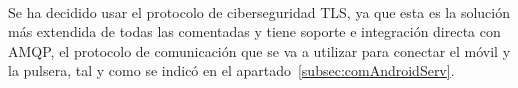 \paragraph{}
Se ha decidido usar el protocolo de ciberseguridad TLS, ya que esta es la solución más extendida de todas las comentadas y tiene soporte e integración directa con AMQP, el protocolo de comunicación que se va a utilizar para conectar el móvil y la pulsera, tal y como se indicó en el apartado~\ref{subsec:comAndroidServ}.